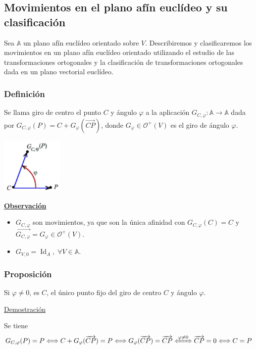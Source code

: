 \documentclass[12pt, a4paper, ones, notitlepage, openany,titlepage]{article}
\newcommand{\demostracion}{\noindent\underline{Demostración}}
\newcommand{\observacion}{\noindent\underline{\textbf{Observación}}}
\begin{document}
\subsection{Movimientos en el plano afín euclídeo y su clasificación}
Sea $\mathbb{A}$ un plano afín euclídeo orientado sobre $V$. Describiremos y clasificaremos los movimientos en un plano afín euclídeo orientado utilizando el estudio de las transformaciones ortogonales y la clasificación de transformaciones ortogonales dada en un plano vectorial euclídeo.

\subsubsection{Definición}
Se llama giro de centro el punto $C$ y ángulo $\varphi$ a la aplicación $G_{C, \varphi}: \mathbb{A} \rightarrow \mathbb{A}$ dada por $G_{C, \varphi}(P)=C+G_{\varphi}(\overrightarrow{C P})$, donde $G_{\varphi} \in \mathcal{O}^{+}(V)$ es el giro de ángulo $\varphi$.
\begin{center}
	\includegraphics[max width=3cm]{2023_04_25_301d1803eaf1bc74cfd9g-080(1)}
\end{center}
\observacion
\begin{itemize}
\item $G_{C, \varphi}$ son movimientos, ya que son la única afinidad con $G_{C, \varphi}(C) = C$ y $\overrightarrow{G_{C, \varphi}} = G_\varphi \in \mathcal{O}^+(V)$.
\item $G_{V,0} = \operatorname{Id}_A, \; \forall V \in \mathbb{A}$.
\end{itemize}

\subsubsection{Proposición}
\noindent Si $\varphi \neq 0$, es $C$, el único punto fijo del giro de centro $C$ y ángulo $\varphi$.

\demostracion

Se tiene
$$
G_{C, \varphi}(P)=P \Longleftrightarrow C+G_{\varphi}(\overrightarrow{C P})=P \Longleftrightarrow G_{\varphi}(\overrightarrow{C P})=\overrightarrow{C P} \xLeftrightarrow{\varphi \neq 0} \overrightarrow{C P}=0 \Longleftrightarrow C=P
$$
\end{document}
